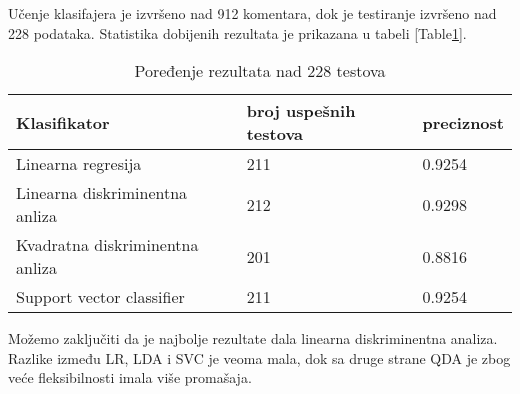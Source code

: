 Učenje klasifajera je izvršeno nad 912 komentara, dok je testiranje izvršeno nad
228 podataka. Statistika dobijenih rezultata je prikazana u tabeli [Table\ref{tab:rezultati}].

\begin{table}[H]
  \caption{Poređenje rezultata nad 228 testova}
  \label{tab:rezultati}
  \centering
  \begin{tabular}{ | l | l | l |}
    \hline
  Klasifikator & broj uspešnih testova & preciznost \\ \hline
  Linearna regresija & 211 & 0.9254 \\ \hline
  Linearna diskriminentna anliza &  212 & 0.9298 \\ \hline
  Kvadratna diskriminentna anliza &  201 & 0.8816 \\ \hline
  Support vector classifier & 211 & 0.9254 \\
  \hline
  \end{tabular}
\end{table}


Možemo zaključiti da je najbolje rezultate dala linearna diskriminentna analiza.
Razlike između LR, LDA i SVC je veoma mala, dok sa druge strane QDA je zbog
veće fleksibilnosti imala više promašaja.
